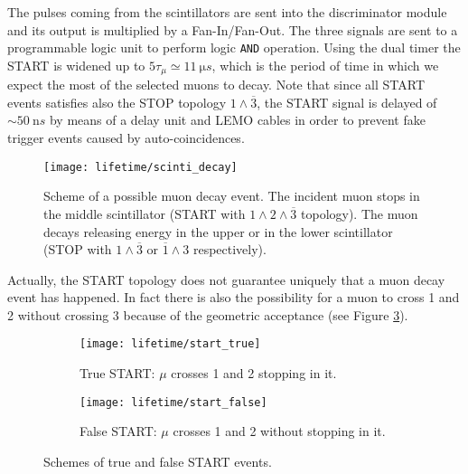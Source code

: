 The pulses coming from the scintillators are sent into the discriminator module and its output is multiplied by a Fan-In/Fan-Out. The three signals are sent to a programmable logic unit to perform logic \texttt{AND} operation. 
Using the dual timer the START is widened up to $5 \tau_{\mu} \simeq \SI{11}{\micro s}$, which is the period of time in which we expect the most of the selected muons to decay.  %
Note that since all START events satisfies also the STOP topology $1 \wedge \overline{3}$, the START signal is delayed of $\sim \SI{50}{\nano s}$ by means of a delay unit and LEMO cables in order to prevent fake trigger events caused by auto-coincidences.

\begin{figure}[!h]
	\centering
	\texttt{[image: lifetime/scinti\_decay]}
	\caption{Scheme of a possible muon decay event. The incident muon stops in the middle scintillator (START with $1 \wedge 2 \wedge \overline{3}$ topology). The muon decays releasing energy in the upper or in the lower scintillator (STOP with $1 \land \overline 3$ or $\overline 1 \land 3$ respectively).}
	\label{fig::scinti_decay}
\end{figure}

Actually, the START topology does not guarantee uniquely that a muon decay event has happened. In fact there is also the possibility for a muon to cross 1 and 2 without crossing 3 because of the geometric acceptance (see Figure \ref{start_false}).

\begin{figure}[!thp]
	\centering
	\begin{subfigure}{.3\linewidth}
		\centering
		\texttt{[image: lifetime/start\_true]}
		\caption{True START: $\mu$ crosses 1 and 2 stopping in it.}
		\label{start_true}
	\end{subfigure}
	\begin{subfigure}{.3\linewidth}
		\centering
		\texttt{[image: lifetime/start\_false]}
		\caption{False START: $\mu$ crosses 1 and 2 without stopping in it.}\label{start_false}
	\end{subfigure}
	\caption{Schemes of true and false START events.}
	\label{}
\end{figure}


